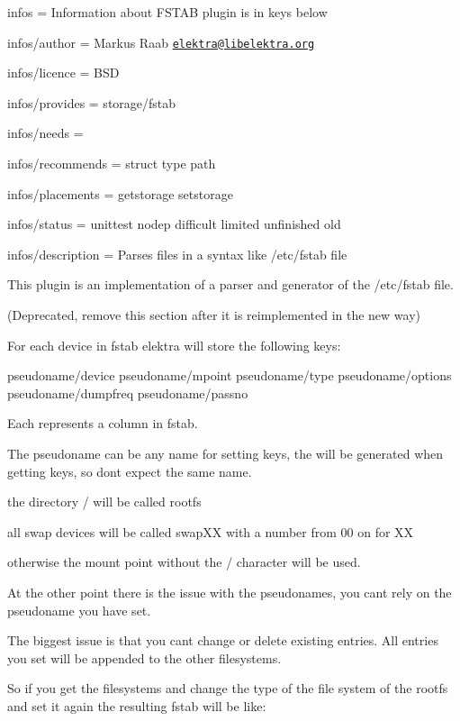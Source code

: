 
\begin{DoxyItemize}
\item infos = Information about F\+S\+T\+AB plugin is in keys below
\item infos/author = Markus Raab \href{mailto:elektra@libelektra.org}{\tt elektra@libelektra.\+org}
\item infos/licence = B\+SD
\item infos/provides = storage/fstab
\item infos/needs =
\item infos/recommends = struct type path
\item infos/placements = getstorage setstorage
\item infos/status = unittest nodep difficult limited unfinished old
\item infos/description = Parses files in a syntax like /etc/fstab file
\end{DoxyItemize}

This plugin is an implementation of a parser and generator of the /etc/fstab file.

(Deprecated, remove this section after it is reimplemented in the new way)

For each device in fstab elektra will store the following keys\+:


\begin{DoxyCode}
pseudoname/device
pseudoname/mpoint
pseudoname/type
pseudoname/options
pseudoname/dumpfreq
pseudoname/passno
\end{DoxyCode}


Each represents a column in fstab.

The pseudoname can be any name for setting keys, the will be generated when getting keys, so don\textquotesingle{}t expect the same name.

the directory {\ttfamily /} will be called {\ttfamily rootfs}

all swap devices will be called {\ttfamily swap\+XX} with a number from 00 on for XX

otherwise the mount point without the \textquotesingle{}/\textquotesingle{} character will be used.

At the other point there is the issue with the pseudonames, you can\textquotesingle{}t rely on the pseudoname you have set.

The biggest issue is that you can\textquotesingle{}t change or delete existing entries. All entries you set will be appended to the other filesystems.

So if you get the filesystems and change the type of the file system of the rootfs and set it again the resulting fstab will be like\+:


